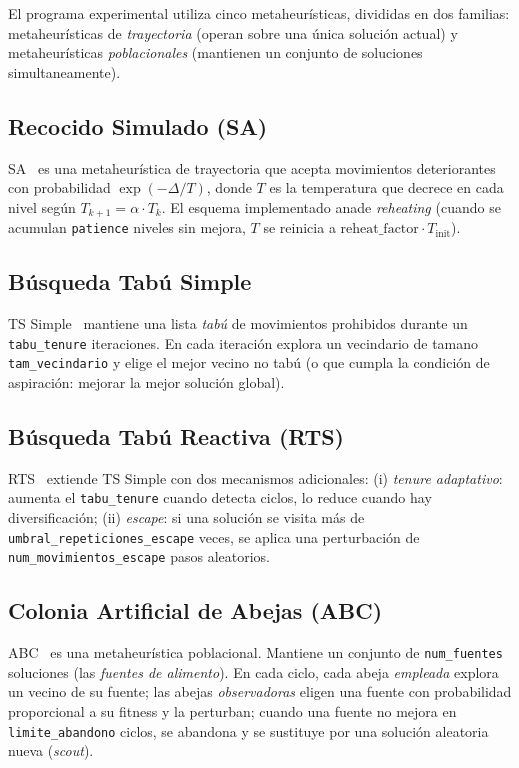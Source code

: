 \documentclass[11pt,a4paper]{article}
\theoremstyle{definition}
\theoremstyle{remark}
\begin{document}
El programa experimental utiliza cinco metaheurísticas, divididas en dos
familias: metaheurísticas de \emph{trayectoria} (operan sobre una única
solución actual) y metaheurísticas \emph{poblacionales} (mantienen un
conjunto de soluciones simultaneamente).

\subsection{Recocido Simulado (SA)}

SA~\cite{kirkpatrick1983} es una metaheurística de trayectoria que acepta
movimientos deteriorantes con probabilidad $\exp(-\Delta/T)$, donde $T$ es la
temperatura que decrece en cada nivel según
$T_{k+1} = \alpha \cdot T_k$. El esquema implementado anade
\emph{reheating} (cuando se acumulan \texttt{patience} niveles sin
mejora, $T$ se reinicia a $\text{reheat\_factor} \cdot T_{\text{init}}$).

\subsection{Búsqueda Tabú Simple}

TS Simple~\cite{glover1986, glover1997} mantiene una lista \emph{tabú} de movimientos prohibidos
durante un \texttt{tabu\_tenure} iteraciones. En cada iteración explora
un vecindario de tamano \texttt{tam\_vecindario} y elige el mejor vecino
no tabú (o que cumpla la condición de aspiración: mejorar la mejor
solución global).

\subsection{Búsqueda Tabú Reactiva (RTS)}

RTS~\cite{battiti1994} extiende TS Simple con dos mecanismos adicionales:
(i) \emph{tenure adaptativo}: aumenta el \texttt{tabu\_tenure} cuando
detecta ciclos, lo reduce cuando hay diversificación;
(ii) \emph{escape}: si una solución se visita más de
\texttt{umbral\_repeticiones\_escape} veces, se aplica una perturbación
de \texttt{num\_movimientos\_escape} pasos aleatorios.

\subsection{Colonia Artificial de Abejas (ABC)}

ABC~\cite{karaboga2005} es una metaheurística poblacional. Mantiene un conjunto de
\texttt{num\_fuentes} soluciones (las \emph{fuentes de alimento}). En
cada ciclo, cada abeja \emph{empleada} explora un vecino de su fuente;
las abejas \emph{observadoras} eligen una fuente con probabilidad
proporcional a su fitness y la perturban; cuando una fuente no mejora
en \texttt{limite\_abandono} ciclos, se abandona y se sustituye por una
solución aleatoria nueva (\emph{scout}).
\end{document}
